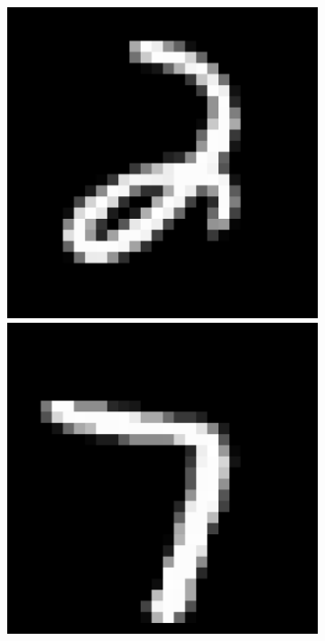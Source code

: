 \begin{figure}[H]
\begin{subfigure}[b]{2cm}
    \vspace{0.15cm}
    \end{subfigure}%
    \hspace{0.0075\textwidth}
    \begin{subfigure}[b]{2cm}
    \includegraphics[width =\textwidth]{figs/MNIST/mnist_2.pdf}
    \vspace{-1.07\baselineskip}\\[1ex]
    \includegraphics[width =\textwidth]{figs/MNIST/mnist_7.pdf}

\end{subfigure}
\end{figure}
